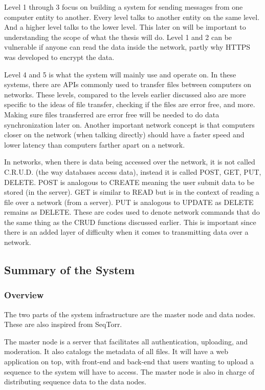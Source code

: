 \documentclass[acmsmall]{acmart}
\begin{document}
Level 1 through 3 focus on building a system for sending messages from one computer entity to another. Every level talks to another entity on the same level. And a higher level talks to the lower level. This later on will be important to understanding the scope of what the thesis will do. Level 1 and 2 can be vulnerable if anyone can read the data inside the network, partly why HTTPS was developed to encrypt the data. 

Level 4 and 5 is what the system will mainly use and operate on. In these systems, there are APIs commonly used to transfer files between computers on networks. These levels, compared to the levels earlier discussed also are more specific to the ideas of file transfer, checking if the files are error free, and more. Making sure files transferred are error free will be needed to do data synchronization later on. Another important network concept is that computers closer on the network (when talking directly) should have a faster speed and lower latency than computers farther apart on a network.

In networks, when there is data being accessed over the network, it is not called C.R.U.D. (the way databases access data), instead it is called POST, GET, PUT, DELETE. POST is analogous to CREATE meaning the user submit data to be stored (in the server). GET is similar to READ but is in the context of reading a file over a network (from a server). PUT is analogous to UPDATE as DELETE remains as DELETE. These are codes used to denote network commands that do the same thing as the CRUD functions discussed earlier. This is important since there is an added layer of difficulty when it comes to transmitting data over a network. 


\subsection{Summary of the System}

\subsubsection{Overview}
The two parts of the system infrastructure are the master node and data nodes. These are also inspired from SeqTorr. 

The master node is a server that facilitates all authentication, uploading, and moderation. It also catalogs the metadata of all files. It will have a web application on top, with front-end and back-end that users wanting to upload a sequence to the system will have to access. The master node is also in charge of distributing sequence data to the data nodes.
\end{document}
